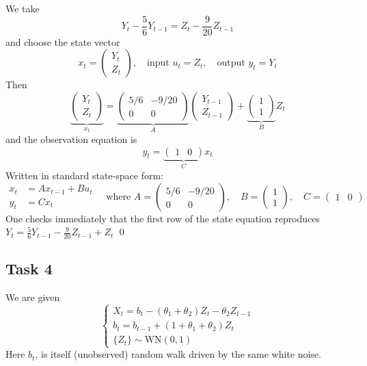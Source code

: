 \documentclass[11pt,a4paper]{article}
\begin{document}
    We take \[ Y_t - \frac56 Y_{t-1} = Z_t - \frac9{20} Z_{t-1} \]
    and choose the state vector
    \[ x_t = \begin{pmatrix} Y_t \\ Z_t \end{pmatrix}, \quad \text{input } u_t = Z_t, \quad \text{output } y_t = Y_t \]
    Then
    \[ \underbrace{\begin{pmatrix} Y_t \\ Z_t \end{pmatrix}}_{x_t} = \underbrace{\begin{pmatrix} 5/6 & -9/20 \\ 0 & 0 \end{pmatrix}}_{A} \begin{pmatrix} Y_{t-1} \\ Z_{t-1} \end{pmatrix} + \underbrace{\begin{pmatrix} 1 \\ 1\end{pmatrix}}_{B} Z_t \]
    and the observation equation is \[ y_t = \underbrace{\begin{pmatrix} 1 & 0 \end{pmatrix}}_{C} x_t \]
    Written in standard state-space form:
    \[
        \boxed{
            \begin{aligned}
                x_t &= A x_{t-1} + B u_t \\
                y_t &= C x_t
            \end{aligned}
        } \quad \text{where }
        A = \begin{pmatrix}
        5/6 & -9/20 \\
        0 & 0
        \end{pmatrix}, \quad
        B = \begin{pmatrix}
            1 \\ 1
        \end{pmatrix}, \quad
        C = \begin{pmatrix}
            1 & 0
        \end{pmatrix}
    \] 
    One checks immediately that the first row of the state equation reproduces $ Y_t = \frac56 Y_{t-1} - \frac9{20} Z_{t-1} + Z_t $ \qed

    \subsection*{Task 4}
    We are given
    \[ \begin{cases} X_t = b_t - (\theta_1 + \theta_2) Z_t - \theta_2 Z_{t-1} \\ b_t = b_{t-1} + (1+\theta_1 + \theta_2) Z_t \\ \{ Z_t \} \sim \mathrm{WN}(0, 1) \end{cases} \]
    Here $b_t$, is itself (unobserved) random walk driven by the same white noise.
\end{document}
